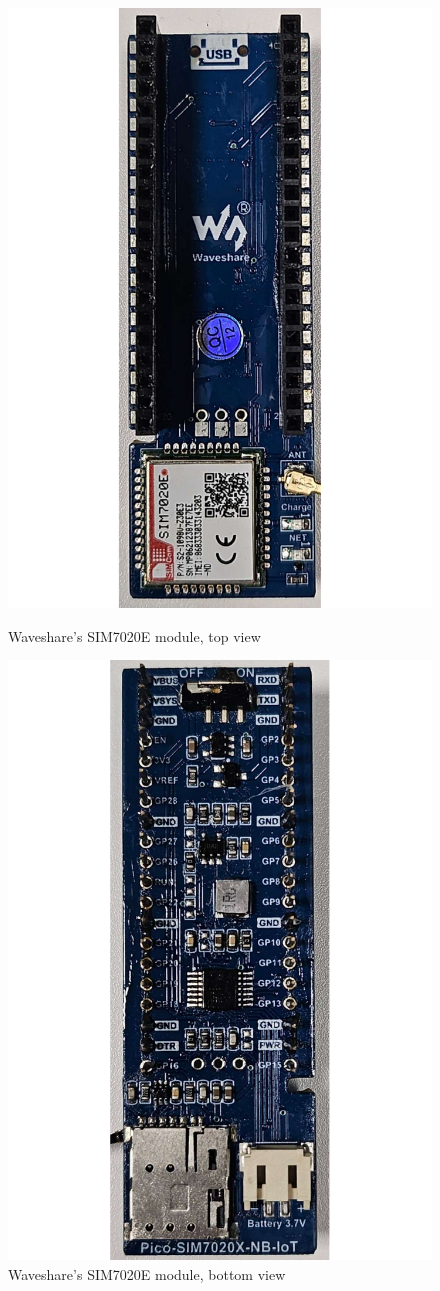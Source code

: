 \begin{figure}[h]
    \centering
    \begin{minipage}[b]{0.45\textwidth}
        \centering
        \includegraphics[width=.6\textwidth]{Imagenes/Vectorial/sim7020e_topside.pdf}
        \caption{Waveshare's SIM7020E module, top view}
        \label{fig:sim7020e_topview}
    \end{minipage}
    \hfill
    \begin{minipage}[b]{0.45\textwidth}
        \centering
        \includegraphics[width=.6\textwidth]{Imagenes/Vectorial/sim7020e_bottomside.pdf}
        \caption{Waveshare's SIM7020E module, bottom view}
        \label{fig:sim7020e_bottomview}
    \end{minipage}
\end{figure}


